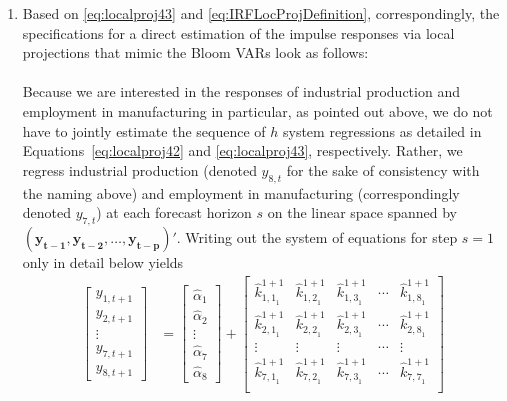 \documentclass[a4paper,11pt,listof=nochaptergap,oneside,pointednumbers,bibtotoc,bigheadings,liststotoc]{scrbook}
\theoremstyle{mysatz}
\theoremstyle{mydefinition}
\theoremstyle{mybemerkung}
\let\oldhat\hat
\newcommand{\vect}[1]{\boldsymbol{\mathbf{#1}}}
\newcommand{\hattnobf}[1]{\oldhat{#1}}
\begin{document}
\begin{enumerate}
\item Based on \ref{eq:localproj43} and \ref{eq:IRFLocProjDefinition}, correspondingly, the specifications for a direct estimation of the impulse responses via local projections that mimic the Bloom VARs look as follows:\\
\\
Because we are interested in the responses of industrial production and employment in manufacturing in particular, as pointed out above, we do not have to jointly estimate the sequence of $h$ system regressions as detailed in Equations~\ref{eq:localproj42} and \ref{eq:localproj43}, respectively. Rather, we regress industrial production (denoted $y_{8,t}$ for the sake of consistency with the naming above) and employment in manufacturing (correspondingly denoted $y_{7, t}$) at each forecast horizon $s$ on the linear space spanned by $(\vect{y_{t-1}}, \vect{y_{t-2}}, \dots, \vect{y_{t-p}})'$. Writing out the system of equations for step $s=1$ only in detail below yields
\begin{equation} \label{eq:localproj46}
\begin{split}
		\begin{bmatrix}
    		y_{1,t+1} \\
    		y_{2,t+1} \\
		\vdots \\
		y_{7, t+1} \\
		y_{8,t+1}
 		\end{bmatrix} & = 
		\begin{bmatrix}
    		\hattnobf{\alpha}_{{1}} \\
    		\hattnobf{\alpha}_{{2}} \\
		\vdots \\
		\hattnobf{\alpha}_{{7}} \\
		\hattnobf{\alpha}_{{8}}
 		\end{bmatrix} + 
		\begin{bmatrix}
    		{\hattnobf{k}_{{1, 1}_1}^{1+1}} & {\hattnobf{k}_{{1, 2}_1}^{1+1}} & {\hattnobf{k}_{{1, 3}_1}^{1+1}} & \cdots & {\hattnobf{k}_{{1, 8}_1}^{1+1}}\\
    		{\hattnobf{k}_{{2, 1}_1}^{1+1}} & {\hattnobf{k}_{{2, 2}_1}^{1+1}} & {\hattnobf{k}_{{2, 3}_1}^{1+1}} & \cdots & {\hattnobf{k}_{{2, 8}_1}^{1+1}}\\
		\vdots & \vdots & \vdots & \cdots & \vdots \\
		{\hattnobf{k}_{{7, 1}_1}^{1+1}} & {\hattnobf{k}_{{7, 2}_1}^{1+1}} & {\hattnobf{k}_{{7, 3}_1}^{1+1}} & \cdots & {\hattnobf{k}_{{7, 7}_1}^{1+1}}\\

\end{bmatrix}
\end{split}
\end{equation}
\end{enumerate}
\end{document}
